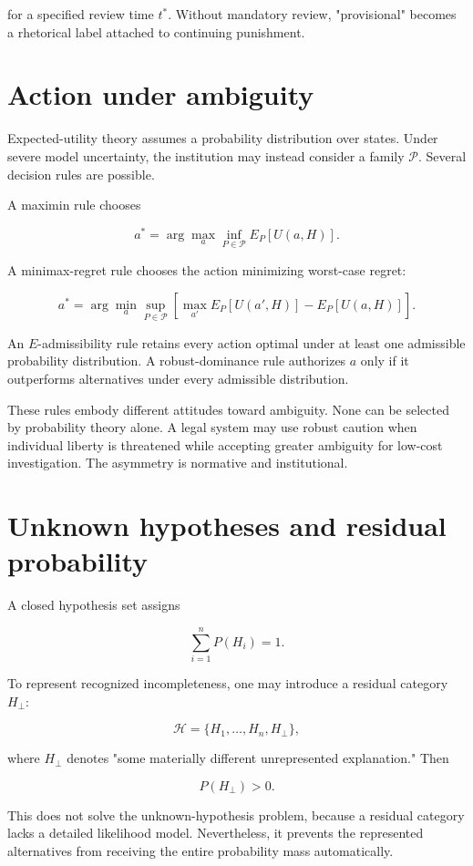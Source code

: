 for a specified review time \(t^\ast\). Without mandatory review, "provisional" becomes a rhetorical label attached to continuing punishment.

\section{Action under ambiguity}
\label{sec:a33}

Expected-utility theory assumes a probability distribution over states. Under severe model uncertainty, the institution may instead consider a family \(\mathcal P\). Several decision rules are possible.

A maximin rule chooses

\[
a^\ast
=
\arg\max_a
\inf_{P\in\mathcal P}
E_P[U(a,H)].
\]

A minimax-regret rule chooses the action minimizing worst-case regret:

\[
a^\ast
=
\arg\min_a
\sup_{P\in\mathcal P}
\left[
\max_{a'}E_P[U(a',H)]
-
E_P[U(a,H)]
\right].
\]

An \(E\)-admissibility rule retains every action optimal under at least one admissible probability distribution. A robust-dominance rule authorizes \(a\) only if it outperforms alternatives under every admissible distribution.

These rules embody different attitudes toward ambiguity. None can be selected by probability theory alone. A legal system may use robust caution when individual liberty is threatened while accepting greater ambiguity for low-cost investigation. The asymmetry is normative and institutional.

\section{Unknown hypotheses and residual probability}
\label{sec:a34}

A closed hypothesis set assigns

\[
\sum_{i=1}^{n}P(H_i)=1.
\]

To represent recognized incompleteness, one may introduce a residual category \(H_\bot\):

\[
\mathcal H
=
\{H_1,\ldots,H_n,H_\bot\},
\]

where \(H_\bot\) denotes "some materially different unrepresented explanation." Then

\[
P(H_\bot)>0.
\]

This does not solve the unknown-hypothesis problem, because a residual category lacks a detailed likelihood model. Nevertheless, it prevents the represented alternatives from receiving the entire probability mass automatically.

